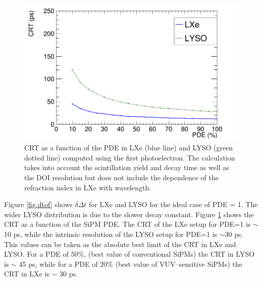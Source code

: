 \documentclass[review]{elsarticle}
\begin{document}
\begin{figure}[!bhtp]
	\centering
	\includegraphics[scale=0.36]{../img/PetaloTOF/CRTvsPDELXeLYSONoJitterFstPE.png}
	\caption{\label{fig.crt1} CRT as a function of the PDE in LXe (blue line) and LYSO (green dotted line) computed using the first photoelectron. The calculation takes into account the scintillation yield and decay time as well as the DOI resolution but does not include
	the dependence of the refraction index in LXe with wavelength.}
\end{figure}

 Figure \ref{fig.dtof} shows $\delta \Delta t$ for LXe and LYSO for the ideal case of PDE = 1. The wider LYSO distribution is due to the slower decay constant.  Figure \ref{fig.crt1} shows the CRT as a function of the
 SiPM PDE. The CRT of the LXe setup for PDE=1 is $\sim$10 ps, while the
 intrinsic resolution of the LYSO setup for PDE=1 is $\sim$30 ps.  This values can be taken as the absolute best limit of the CRT in LXe and LYSO. For a PDE of 50\%, (best value of conventional SiPMs) the CRT in LYSO is $\sim$ 45 ps, while for a PDE of 20\% (best value of VUV--sensitive SiPMs) the CRT in LXe is $\sim$ 30 ps.   
\end{document}
